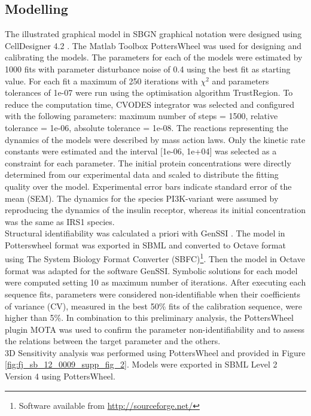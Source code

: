 \subsection{Modelling}
\label{paper2-subsec:Modelling}
The illustrated graphical model in SBGN graphical notation \citep{lenovere2009systems} were designed using CellDesigner 4.2 \citep{Funahashi2003, Funahashi2008}. The Matlab Toolbox PottersWheel \citep{Maiwald2008} was used for designing and calibrating the models. The parameters for each of the models were estimated by 1000 fits with parameter disturbance noise of 0.4 using the best fit as starting value. For each fit a maximum of 250 iterations with $\chi^2$ and parameters tolerances of 1e-07 were run using the optimisation algorithm TrustRegion. To reduce the computation time, CVODES integrator was selected and configured with the following parameters: maximum number of steps = 1500, relative tolerance = 1e-06, absolute tolerance = 1e-08. 
The reactions representing the dynamics of the models were described by mass action laws. Only the kinetic rate constants were estimated and the interval [1e-06, 1e+04] was selected as a constraint for each parameter. The initial protein concentrations were directly determined from our experimental data and scaled to distribute the fitting quality over the model. Experimental error bars indicate standard error of the mean (SEM). The dynamics for the species PI3K-variant were assumed by reproducing the dynamics of the insulin receptor, whereas its initial concentration was the same as IRS1 species. \\
Structural identifiability was calculated a priori with GenSSI \citep{Chis2011}. The model in Potterswheel format was exported in SBML and converted to Octave format using The System Biology Format Converter (SBFC)\footnote{Software available from \href{http://sourceforge.net/}{http://sourceforge.net/}}. Then the model in Octave format was adapted for the software GenSSI. Symbolic solutions for each model were computed setting 10 as maximum number of iterations. After executing each sequence fits, parameters were considered non-identifiable when their coefficients of variance (CV), measured in the best 50\% fits of the calibration sequence, were higher than 5\%. In combination to this preliminary analysis, the PottersWheel plugin MOTA was used to confirm the parameter non-identifiability and to assess the relations between the target parameter and the others. \\
3D Sensitivity analysis was performed using PottersWheel and provided in Figure \ref{fig:fj_sb_12_0009_supp_fig_2}. Models were exported in SBML \citep{hucka2003systems} Level 2 Version 4 using PottersWheel.

